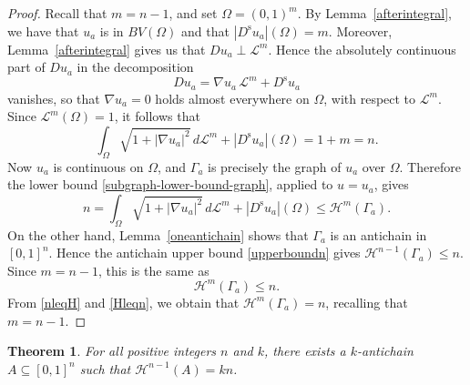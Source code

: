 \documentclass{publicadapt}
\newtheorem{theorem}{Theorem}
\begin{document}
\begin{proof}
 Recall that $m=n-1$, and set $ \Omega=(0,1)^m$. By Lemma~\ref{afterintegral}, we have that $u_a$ is in $ BV(\Omega)$ and that $ |D^{\operatorname{s}}u_a|(\Omega) = m$. 
 Moreover, Lemma~\ref{afterintegral} gives us that $Du_a \perp \mathcal{L}^m$. Hence the absolutely continuous part of \(Du_a\) in the decomposition $$ Du_a = \nabla u_a \, 
 \mathcal{L}^m+D^{\operatorname{s}}u_a $$ vanishes, so that $ \nabla u_a=0$ holds almost everywhere on $\Omega$, with respect to $\mathcal{L}^{m}$. 
 Since $\mathcal{L}^m(\Omega)=1$, it follows that $$ \int_{\Omega}\sqrt{1+|\nabla u_a|^2}\,d\mathcal L^m + |D^{\operatorname{s}}u_a|(\Omega) = 1+m = n. $$ 
 Now $u_a$ is continuous on $\Omega$, and $\Gamma_a$ is precisely the graph of \(u_a\) over \(\Omega\). Therefore the lower bound \eqref{subgraph-lower-bound-graph}, applied 
 to $u = u_a$, gives 
\begin{equation}\label{nleqH} 
 n = \int_{\Omega}\sqrt{1+|\nabla u_a|^2}\,d\mathcal L^m + |D^{\operatorname{s}}u_a|(\Omega) \leq \mathcal H^m(\Gamma_a).
\end{equation}
 On the other hand, Lemma~\ref{oneantichain} shows that $\Gamma_a$ is an antichain in $[0,1]^n$. Hence the antichain upper bound \eqref{upperboundn} gives 
 $ \mathcal H^{n-1}(\Gamma_a)\leq n$. Since \(m=n-1\), this is the same as 
\begin{equation}\label{Hleqn} 
 \mathcal H^m(\Gamma_a)\leq n.
\end{equation}
 From \eqref{nleqH} and \eqref{Hleqn}, we obtain that $ \mathcal{H}^m(\Gamma_a)=n$, recalling that $m=n-1$. 
\end{proof}

\begin{theorem}
 For all positive integers $n$ and $k$, there exists a $k$-antichain \(A\subseteq[0,1]^n\) such that $ \mathcal H^{n-1}(A)=kn$.
\end{theorem}
\end{document}
